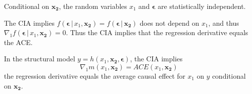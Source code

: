 \documentclass[DIV=14,titlepage=false]{scrreprt}
\begin{document}
\begin{definition}
    Conditional on $\mathbf{x_2}$, the random variables $x_1$ and $\boldsymbol{\epsilon}$ are statistically independent.
\end{definition}

\vspace{10pt}

The CIA implies $f(\boldsymbol{\epsilon} \, | \, x_1, \boldsymbol{x_2})=f(\boldsymbol{\epsilon} \, | \, \boldsymbol{x_2})$ does not depend on $x_1$, and thus $\nabla_1 f(\boldsymbol{\epsilon} \, | \, x_1, \boldsymbol{x_2})=0$. Thus the CIA implies that the regression derivative equals the ACE.

\begin{theorem}
    In the structural model $y = h(x_1, \mathbf{x_2},\boldsymbol{\epsilon})$, the CIA implies \[ \nabla_1 m(x_1, \boldsymbol{x_2})=ACE(x_1, \boldsymbol{x_2}) \] the regression derivative equals the average causal effect for $x_1$ on $y$ conditional on $\mathbf{x_2}$.
\end{theorem}
\end{document}
